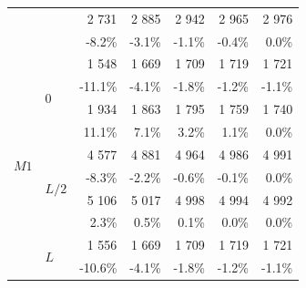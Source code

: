\begin{figure}[p]
\begin{fullpage}
\begin{tabularx}{0.65\textwidth}{@{} XX rrrrr@{}}
&&{\color{black}\normalsize2 731}&{\color{black}\normalsize2 885}&{\color{black}\normalsize2 942}&{\color{black}\normalsize2 965}&{\color{black}\normalsize2 976}\\
&&{\color{black}\scriptsize-8.2\%}&{\color{black}\scriptsize-3.1\%}&{\color{black}\scriptsize-1.1\%}&{\color{black}\scriptsize-0.4\%}&{\color{black}\scriptsize0.0\%}\\\midrule
\multirow{12}{*}{$M1$}&\multirow{4}{*}{$0$}&{\color{Tblue}\normalsize1 548}&{\color{Tblue}\normalsize1 669}&{\color{Tblue}\normalsize1 709}&{\color{Tblue}\normalsize1 719}&{\color{Tblue}\normalsize1 721}\\
&&{\color{Tblue}\scriptsize-11.1\%}&{\color{Tblue}\scriptsize-4.1\%}&{\color{Tblue}\scriptsize-1.8\%}&{\color{Tblue}\scriptsize-1.2\%}&{\color{Tblue}\scriptsize-1.1\%}\\
&&{\color{black}\normalsize1 934}&{\color{black}\normalsize1 863}&{\color{black}\normalsize1 795}&{\color{black}\normalsize1 759}&{\color{black}\normalsize1 740}\\
&&{\color{black}\scriptsize11.1\%}&{\color{black}\scriptsize7.1\%}&{\color{black}\scriptsize3.2\%}&{\color{black}\scriptsize1.1\%}&{\color{black}\scriptsize0.0\%}\\\cmidrule[0.5\cmidrulewidth]{2-7}
&\multirow{4}{*}{$L/2$}&{\color{Tblue}\normalsize4 577}&{\color{Tblue}\normalsize4 881}&{\color{Tblue}\normalsize4 964}&{\color{Tblue}\normalsize4 986}&{\color{Tblue}\normalsize4 991}\\
&&{\color{Tblue}\scriptsize-8.3\%}&{\color{Tblue}\scriptsize-2.2\%}&{\color{Tblue}\scriptsize-0.6\%}&{\color{Tblue}\scriptsize-0.1\%}&{\color{Tblue}\scriptsize0.0\%}\\
&&{\color{black}\normalsize5 106}&{\color{black}\normalsize5 017}&{\color{black}\normalsize4 998}&{\color{black}\normalsize4 994}&{\color{black}\normalsize4 992}\\
&&{\color{black}\scriptsize2.3\%}&{\color{black}\scriptsize0.5\%}&{\color{black}\scriptsize0.1\%}&{\color{black}\scriptsize0.0\%}&{\color{black}\scriptsize0.0\%}\\\cmidrule[0.5\cmidrulewidth]{2-7}
&\multirow{4}{*}{$L$}&{\color{Tblue}\normalsize1 556}&{\color{Tblue}\normalsize1 669}&{\color{Tblue}\normalsize1 709}&{\color{Tblue}\normalsize1 719}&{\color{Tblue}\normalsize1 721}\\
&&{\color{Tblue}\scriptsize-10.6\%}&{\color{Tblue}\scriptsize-4.1\%}&{\color{Tblue}\scriptsize-1.8\%}&{\color{Tblue}\scriptsize-1.2\%}&{\color{Tblue}\scriptsize-1.1\%}\\

\end{tabularx}
\end{fullpage}
\end{figure}
